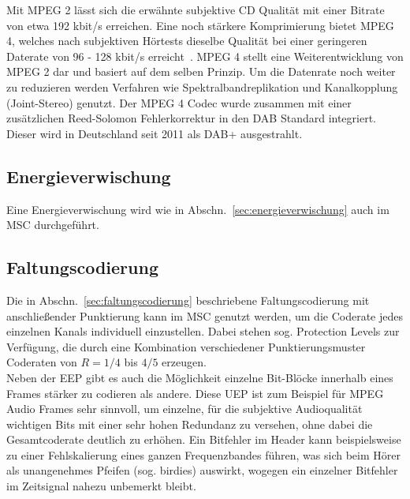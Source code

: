 Mit \ac{MPEG 2} lässt sich die erwähnte subjektive CD Qualität mit einer Bitrate von etwa 192 kbit/s erreichen. Eine noch stärkere Komprimierung bietet \ac{MPEG 4}, welches nach subjektiven Hörtests dieselbe Qualität bei einer geringeren Daterate von 96 - 128 kbit/s erreicht~\cite{mpeg:audio_tests}. \ac{MPEG 4} stellt eine Weiterentwicklung von \ac{MPEG 2} dar und basiert auf dem selben Prinzip. Um die Datenrate noch weiter zu reduzieren werden Verfahren wie Spektralbandreplikation und Kanalkopplung (Joint-Stereo) genutzt. Der \ac{MPEG 4} Codec wurde zusammen mit einer zusätzlichen Reed-Solomon Fehlerkorrektur in den DAB Standard integriert. Dieser wird in Deutschland seit 2011 als DAB+ ausgestrahlt.

\subsection{Energieverwischung}
Eine Energieverwischung wird wie in Abschn.~\ref{sec:energieverwischung} auch im \ac{MSC} durchgeführt.

\subsection{Faltungscodierung}
Die in Abschn.~\ref{sec:faltungscodierung} beschriebene Faltungscodierung mit anschließender Punktierung kann im \ac{MSC} genutzt werden, um die Coderate jedes einzelnen Kanals individuell einzustellen. Dabei stehen sog. Protection Levels zur Verfügung, die durch eine Kombination verschiedener Punktierungsmuster Coderaten von $R=1/4$ bis $4/5$ erzeugen.\\
Neben der \ac{EEP} gibt es auch die Möglichkeit einzelne Bit-Blöcke innerhalb eines Frames stärker zu codieren als andere. Diese \ac{UEP} ist zum Beispiel für MPEG Audio Frames sehr sinnvoll, um einzelne, für die subjektive Audioqualität wichtigen Bits mit einer sehr hohen Redundanz zu versehen, ohne dabei die Gesamtcoderate deutlich zu erhöhen. Ein Bitfehler im Header kann beispielsweise zu einer Fehlskalierung eines ganzen Frequenzbandes führen, was sich beim Hörer als unangenehmes Pfeifen (sog. \glqq birdies\grqq{}) auswirkt, wogegen ein einzelner Bitfehler im Zeitsignal nahezu unbemerkt bleibt.

